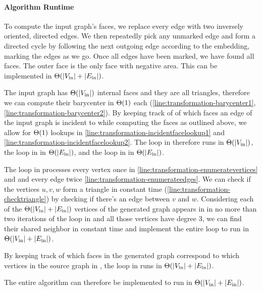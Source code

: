 \paragraph{Algorithm Runtime}

To compute the input graph's faces, we replace every edge with two inversely oriented, directed edges. We then repeatedly pick any unmarked edge and form a directed cycle by following the next outgoing edge according to the embedding, marking the edges as we go. Once all edges have been marked, we have found all faces. The outer face is the only face with negative area. This can be implemented in $\Theta(\left\lvert V_\text{in}\right\rvert + \left\lvert E_\text{in}\right\rvert)$.

The input graph has $\Theta(\left\lvert V_\text{in}\right\rvert)$ internal faces and they are all triangles, therefore we can compute their barycenter in $\Theta(1)$ each (\cref{line:transformation-barycenter1}, \cref{line:transformation-barycenter2}). By keeping track of of which faces an edge of the input graph is incident to while computing the faces as outlined above, we allow for $\Theta(1)$ lookups in \cref{line:transformation-incidentfacelookup1} and \cref{line:transformation-incidentfacelookup2}. The loop in  therefore runs in $\Theta(\left\lvert V_\text{in}\right\rvert)$, the loop in  in $\Theta(\left\lvert E_\text{in}\right\rvert)$, and the loop in  in $\Theta(\left\lvert E_\text{in}\right\rvert)$.

The loop in  processes every vertex once in \cref{line:transformation-enumeratevertices} and and every edge twice \cref{line:transformation-enumerateedges}. We can check if the vertices $u,v,w$ form a triangle in constant time (\cref{line:transformation-checktriangle}) by checking if there's an edge between $v$ and $w$. Considering each of the $\Theta(\left\lvert V_\text{in}\right\rvert + \left\lvert E_\text{in}\right\rvert)$ vertices of the generated graph appears in  in no more than two iterations of the loop in  and all those vertices have degree 3, we can find their shared neighbor in constant time and implement the entire loop to run in $\Theta(\left\lvert V_\text{in}\right\rvert + \left\lvert E_\text{in}\right\rvert)$.

By keeping track of which faces in the generated graph correspond to which vertices in the source graph in , the loop in  runs in $\Theta(\left\lvert V_\text{in}\right\rvert + \left\lvert E_\text{in}\right\rvert)$.

The entire algorithm can therefore be implemented to run in $\Theta(\left\lvert V_\text{in}\right\rvert + \left\lvert E_\text{in}\right\rvert)$.
